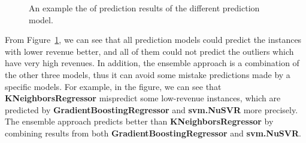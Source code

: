 \documentclass[10pt, oneside]{article}   	%
\begin{document}
\begin{figure}[th]
\centering
{}
\caption{
An example the of prediction results of the different prediction model.}
\label{fig:predict_results}
\end{figure}

From Figure~\ref{fig:predict_results}, we can see that all prediction models could predict the instances with lower revenue better, and all of them could not predict the outliers which have very high revenues. In addition, the ensemble approach is a combination of the other three models, thus it can avoid some mistake predictions made by a specific models. For example, in the figure, we can see that \textbf{KNeighborsRegressor} mispredict some low-revenue instances, which are predicted by \textbf{GradientBoostingRegressor} and \textbf{svm.NuSVR} more precisely. The ensemble approach predicts better than  \textbf{KNeighborsRegressor} by combining results from both \textbf{GradientBoostingRegressor} and \textbf{svm.NuSVR}.
\end{document}
